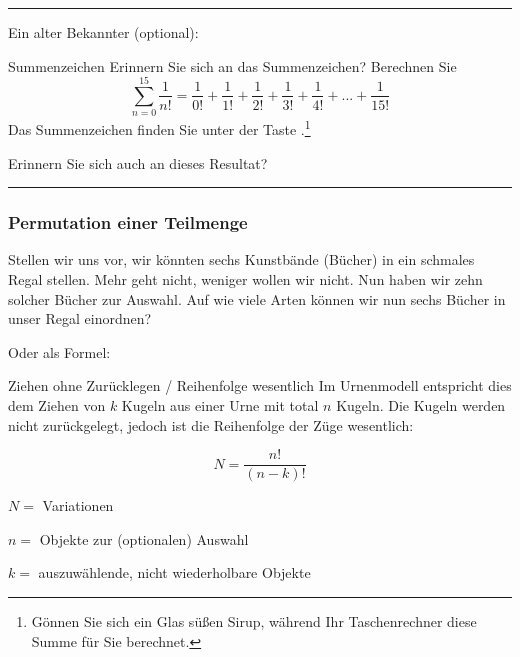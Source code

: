 
\hrule

Ein alter Bekannter (optional):

\vspace{3mm}

\begin{bemerkung}{Summenzeichen}{}
Erinnern Sie sich an das Summenzeichen? Berechnen
Sie $$\sum_{n=0}^{15}\frac{1}{n!} = \frac{1}{0!} + \frac{1}{1!}
+ \frac1{2!} + \frac1{3!} + \frac1{4!} + ... + \frac1{15!}$$ Das Summenzeichen finden Sie unter
der Taste .\footnote{Gönnen Sie sich
ein Glas süßen Sirup, während Ihr Taschenrechner diese Summe für Sie berechnet.}
\end{bemerkung}

Erinnern Sie sich auch an dieses Resultat? 

\vspace{1mm}

\hrule


\newpage


\subsubsection{Permutation einer Teilmenge}\label{kombiVariationEinerTeilmenge}
Stellen wir uns vor, wir könnten sechs Kunstbände (Bücher) in ein schmales
Regal stellen. Mehr geht nicht, weniger wollen wir nicht.
Nun haben wir zehn solcher Bücher zur Auswahl. Auf wie viele Arten können wir nun sechs Bücher in unser Regal einordnen?


Oder als Formel:
\begin{gesetz}{Ziehen ohne Zurücklegen / Reihenfolge wesentlich}{}
Im Urnenmodell entspricht dies dem Ziehen von $k$ Kugeln aus einer
Urne mit total $n$ Kugeln. Die Kugeln werden nicht zurückgelegt,
jedoch ist die Reihenfolge der Züge wesentlich:

$$N =\frac{n!}{(n-k)!}$$

$N = $ Variationen

$n = $ Objekte zur (optionalen) Auswahl

$k = $ auszuwählende, nicht wiederholbare Objekte

\end{gesetz}

